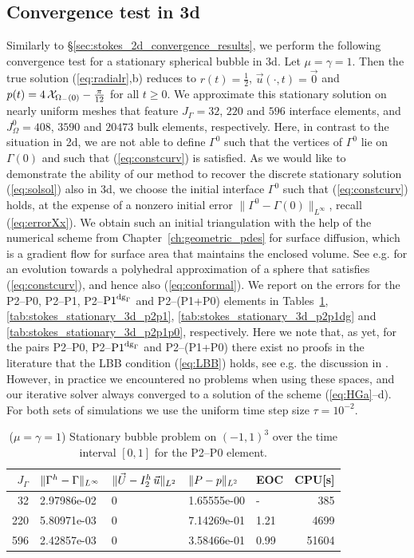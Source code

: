 \subsection{Convergence test in 3d} \label{sec:stokes_3d_convergence_results}
Similarly to \S\ref{sec:stokes_2d_convergence_results}, we perform the following
convergence test for a stationary spherical bubble in 3d. Let $\mu = \gamma =
1$. Then the true solution (\ref{eq:radialr},b) reduces to $r(t) =
\frac{1}{2}$, $\vec u(\cdot, t) = \vec 0$ and $p(t) = 4\,\mathrm{\mathcal{X}}_{\Omega_-(0)}
- \frac{\pi}{12}$ for all $t\geq0$. We approximate this stationary solution on
nearly uniform meshes that feature $J_\Gamma = 32$, $220$ and $596$ interface
elements, and $J_\Omega^0 = 408$, $3590$ and $20473$ bulk elements,
respectively. Here, in contrast to the situation in 2d, we are not able to
define $\Gamma^0$ such that the vertices of $\Gamma^0$ lie on $\Gamma(0)$ and
such that (\ref{eq:constcurv}) is satisfied. As we would like to demonstrate
the ability of our method to recover the discrete stationary solution
(\ref{eq:solsol}) also in 3d, we choose the initial interface $\Gamma^0$ such
that (\ref{eq:constcurv}) holds, at the expense of a nonzero initial error
$\| \Gamma^0 - \Gamma(0) \|_{L^\infty}$, recall (\ref{eq:errorXx}). We obtain
such an initial triangulation with the help of the numerical scheme from
Chapter~\ref{ch:geometric_pdes} for surface diffusion, which is a gradient flow
for surface area that maintains the enclosed volume. See e.g. \cite[Fig.
11]{gflows3d} for an evolution towards a polyhedral approximation of a sphere
that satisfies (\ref{eq:constcurv}), and hence also (\ref{eq:conformal}). We
report on the errors for the P2--P0, P2--P1, P2--${\rm P1}^{{\rm dg}_\Gamma}$
and P2--(P1+P0) elements in Tables~\ref{tab:stokes_stationary_3d_p2p0},
\ref{tab:stokes_stationary_3d_p2p1}, \ref{tab:stokes_stationary_3d_p2p1dg} and
\ref{tab:stokes_stationary_3d_p2p1p0}, respectively. Here we note that, as yet,
for the pairs P2--P0, P2--${\rm P1}^{{\rm dg}_\Gamma}$ and P2--(P1+P0) there exist no proofs in the
literature that the LBB condition (\ref{eq:LBB}) holds, see e.g. the discussion
in \cite[Remark~8.4.3]{BoffiBF13}. However, in practice we encountered no
problems when using these spaces, and our iterative solver always converged to a
solution of the scheme (\ref{eq:HGa}--d). For both sets of simulations we use
the uniform time step size $\tau = 10^{-2}$.
\begin{table}
\center
\begin{tabular}{rllllr}
\hline
$J_\Gamma$ & $\|\Gamma^h - \Gamma\|_{L^\infty}$ & $\|\vec U - I^h_{2}\,\vec u\|_{L^2}$ & $\|P - p\|_{L^2}$ & EOC & CPU[s] \\
\hline
 32 & 2.97986e-02 & 0 & 1.65555e-00 &    - &   385 \\
220 & 5.80971e-03 & 0 & 7.14269e-01 & 1.21 &  4699 \\
596 & 2.42857e-03 & 0 & 3.58466e-01 & 0.99 & 51604 \\
\hline
\end{tabular}
\caption[Stokes 3d stationary bubble errors P2--P0]
{($\mu=\gamma=1$) Stationary bubble problem on $(-1,1)^3$ over the time
interval $[0,1]$ for the P2--P0 element.}
\label{tab:stokes_stationary_3d_p2p0}
\end{table}
